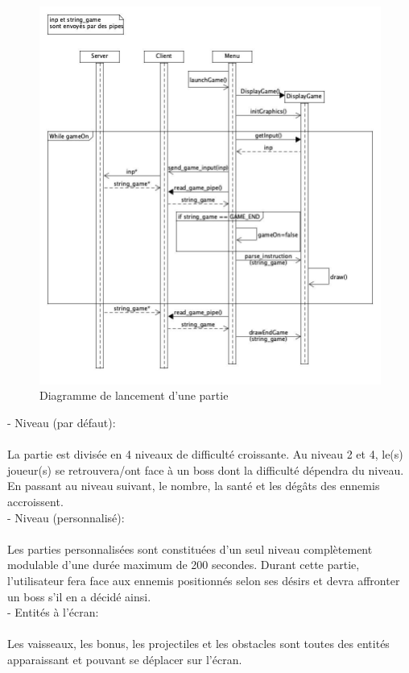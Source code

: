 \documentclass[a4paper,12pt]{article}
\begin{document}
\begin{figure}
\centering
\includegraphics[scale=0.5]{images/launch_game_sequence_diagram.jpg}
\caption{Diagramme de lancement d'une partie}
\end{figure}


- Niveau (par défaut):\\ \\
La partie est divisée en 4 niveaux de difficulté croissante. Au niveau 2 et 4, le(s) joueur(s) se retrouvera/ont face à un boss dont la difficulté dépendra du niveau. En passant au niveau suivant, le nombre, la santé et 
les dégâts des ennemis accroissent.\\

- Niveau (personnalisé):\\ \\
Les parties personnalisées sont constituées d'un seul niveau complètement modulable d'une durée maximum de 200 secondes. Durant cette partie, l'utilisateur fera face aux ennemis positionnés selon ses désirs et devra affronter un boss s'il en a décidé ainsi.\\

- Entités à l’écran:\\ \\
Les vaisseaux, les bonus, les projectiles et les obstacles
sont toutes des entités apparaissant et pouvant se déplacer sur l’écran.\\
\end{document}
